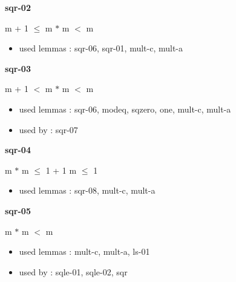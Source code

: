 \documentclass[a4paper]{article}
\begin{document}
\medskip

\bigskip

{\large\bf sqr-02}

\medskip

 \Fol m + 1 $\le$ m $*$ m  $<$ m

\begin{itemize}


\item       used lemmas  : sqr-06, sqr-01, mult-c, mult-a

\end{itemize}

\medskip

\bigskip

{\large\bf sqr-03}

\medskip

 \Fol m + 1 $<$ m $*$ m  $<$ m

\begin{itemize}


\item       used lemmas  : sqr-06, modeq, sqzero, one, mult-c, mult-a
\item       used by      : sqr-07

\end{itemize}

\medskip

\bigskip

{\large\bf sqr-04}

\medskip

 \Fol m $*$ m $\le$ 1 + 1 \Equiv m $\le$ 1

\begin{itemize}


\item       used lemmas  : sqr-08, mult-c, mult-a

\end{itemize}

\medskip

\bigskip

{\large\bf sqr-05}

\medskip

 \Fol \Not m $*$ m $<$ m

\begin{itemize}


\item       used lemmas  : mult-c, mult-a, ls-01
\item       used by      : sqle-01, sqle-02, sqr

\end{itemize}
\end{document}
